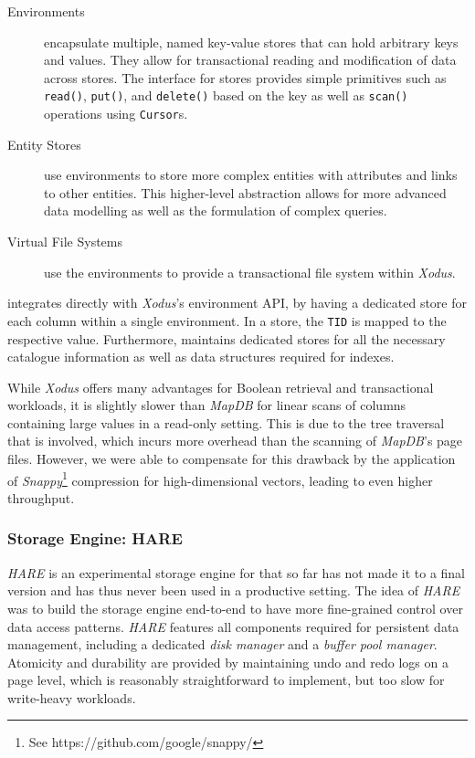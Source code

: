 \begin{description}
    \item [Environments] encapsulate multiple, named key-value stores that can hold arbitrary keys and values. They allow for transactional reading and modification of data across stores. The interface for stores provides simple primitives such as \texttt{read()}, \texttt{put()}, and \texttt{delete()} based on the key as well as \texttt{scan()} operations using \texttt{Cursor}s.
    \item [Entity Stores] use environments to store more complex entities with attributes and links to other entities. This higher-level abstraction allows for more advanced data modelling as well as the formulation of complex queries.
    \item [Virtual File Systems] use the environments to provide a transactional file system within \emph{Xodus}.
\end{description}

\cottontail{} integrates directly with \emph{Xodus}'s environment API, by having a dedicated store for each column within a single environment. In a store, the \texttt{TID} is mapped to the respective value. Furthermore, \cottontail{} maintains dedicated stores for all the necessary catalogue information as well as data structures required for indexes.

While \emph{Xodus} offers many advantages for Boolean retrieval and transactional workloads, it is slightly slower than \emph{MapDB} for linear scans of columns containing large values in a read-only setting. This is due to the tree traversal that is involved, which incurs more overhead than the scanning of \emph{MapDB}'s page files. However, we were able to compensate for this drawback by the application of \emph{Snappy}\footnote{See https://github.com/google/snappy/} compression for high-dimensional vectors, leading to even higher throughput.

\subsubsection{Storage Engine: HARE}

\emph{HARE} is an experimental storage engine for \cottontail{} that so far has not made it to a final version and has thus never been used in a productive setting. The idea of \emph{HARE} was to build the storage engine end-to-end to have more fine-grained control over data access patterns. \emph{HARE} features all components required for persistent data management, including a dedicated \emph{disk manager} and a \emph{buffer pool manager}. Atomicity and durability are provided by maintaining undo and redo logs on a page level, which is reasonably straightforward to implement, but too slow for write-heavy workloads.

